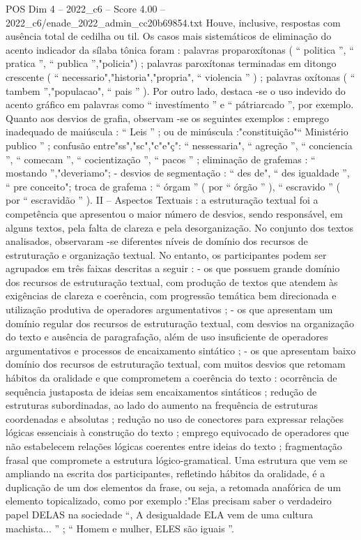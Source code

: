 \begin{textsample}{POS Dim 4 – 2022\_c6 – Score 4.00 – 2022\_c6/enade\_2022\_admin\_cc20b69854.txt}
Houve, inclusive, respostas com ausência total de cedilha ou til.
Os casos mais sistemáticos de eliminação do acento indicador da sílaba tônica foram : palavras proparoxítonas ( “ politica ”, “ pratica ”, “ publica ”,"policia") ; palavras paroxítonas terminadas em ditongo crescente ( “ necessario","historia","propria", “ violencia ” ) ; palavras oxítonas ( “ tambem ”,"populacao", “ pais ” ).
Por outro lado, destaca -se o uso indevido do acento gráfico em palavras como “ investímento ” e “ pátriarcado ”, por exemplo.
Quanto aos desvios de grafia, observam -se os seguintes exemplos : emprego inadequado de maiúscula : “ Leis ” ; ou de minúscula :"constituição"“ Ministério publico ” ; confusão entre"ss","sc","c"e"ç": “ nessessaria", “ agreção ”, “ conciencia ”, “ comecam ”, “ cocientização ”, “ pacos ” ; eliminação de grafemas : “ mostando ”,"deveriamo"; - desvios de segmentação : “ des de", “ des igualdade ”, “ pre conceito"; troca de grafema : “ órgam ” ( por “ órgão ” ), “ escravido ” ( por “ escravidão ” ).
II – Aspectos Textuais : a estruturação textual foi a competência que apresentou o maior número de desvios, sendo responsável, em alguns textos, pela falta de clareza e pela desorganização.
No conjunto dos textos analisados, observaram -se diferentes níveis de domínio dos recursos de estruturação e organização textual.
No entanto, os participantes podem ser agrupados em três faixas descritas a seguir : - os que possuem grande domínio dos recursos de estruturação textual, com produção de textos que atendem às exigências de clareza e coerência, com progressão temática bem direcionada e utilização produtiva de operadores argumentativos ; - os que apresentam um domínio regular dos recursos de estruturação textual, com desvios na organização do texto e ausência de paragrafação, além de uso insuficiente de operadores argumentativos e processos de encaixamento sintático ; - os que apresentam baixo domínio dos recursos de estruturação textual, com muitos desvios que retomam hábitos da oralidade e que comprometem a coerência do texto : ocorrência de sequência justaposta de ideias sem encaixamentos sintáticos ; redução de estruturas subordinadas, ao lado do aumento na frequência de estruturas coordenadas e absolutas ; redução no uso de conectores para expressar relações lógicas essenciais à construção do texto ; emprego equivocado de operadores que não estabelecem relações lógicas coerentes entre ideias do texto ; fragmentação frasal que compromete a estrutura lógico-gramatical.
Uma estrutura que vem se ampliando na escrita dos participantes, refletindo hábitos da oralidade, é a duplicação de um dos elementos da frase, ou seja, a retomada anafórica de um elemento topicalizado, como por exemplo :"Elas precisam saber o verdadeiro papel DELAS na sociedade “, A desigualdade ELA vem de uma cultura machista... ” ; “ Homem e mulher, ELES são iguais ”.

\end{textsample}
